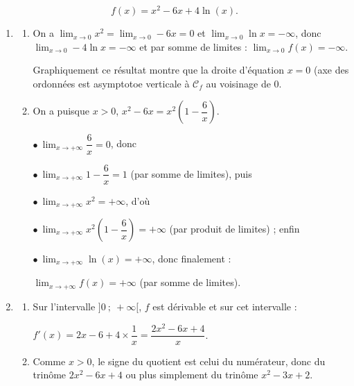 \medskip







\[f(x) = x^2 - 6x + 4\ln (x).\]







\medskip

\begin{enumerate}
\item 
	\begin{enumerate}
		\item 
On a $\displaystyle\lim_{x \to 0} x^2 = \displaystyle\lim_{x \to 0} - 6x = 0$ et $\displaystyle\lim_{x \to 0} \ln x = - \infty$, donc $\displaystyle\lim_{x \to 0} - 4\ln x = - \infty$ et par somme de limites : $\displaystyle\lim_{x \to 0} f(x) = - \infty$.
	

Graphiquement ce résultat montre que la droite d'équation $x = 0$ (axe des ordonnées est asymptotoe verticale à $\mathcal{C}_f$  au voisinage de 0.
		\item 
On a puisque $x > 0$, \: $x^2 - 6x = x^2\left(1 - \dfrac{6}{x}\right)$.

$\bullet~$$\displaystyle\lim_{x \to + \infty} \dfrac{6}{x} = 0$, donc 

$\bullet~$$\displaystyle\lim_{x \to + \infty} 1 - \dfrac{6}{x} = 1$ (par somme de limites), puis

$\bullet~$$\displaystyle\lim_{x \to + \infty} x^2 = + \infty$, d'où

$\bullet~$$\displaystyle\lim_{x \to + \infty}x^2\left(1 - \dfrac{6}{x}\right) = + \infty$ (par produit de limites) ; enfin 

$\bullet~$$\displaystyle\lim_{x \to + \infty}\ln (x) = + \infty$, donc finalement :

$\displaystyle\lim_{x \to + \infty}f(x) = + \infty$ (par somme de limites).
	\end{enumerate}	
\item
	\begin{enumerate}
		\item 
Sur l'intervalle $]0~;~+ \infty[$, \: $f$ est dérivable et sur cet intervalle :

$f'(x) = 2x - 6 + 4 \times \dfrac1x = \dfrac{2x^2 - 6x + 4}{x}$.
		\item 
Comme $x > 0$, le signe du quotient est celui du numérateur, donc du trinôme $2x^2 - 6x + 4$ ou plus simplement du trinôme $x^2 - 3x + 2$.


\end{enumerate}
\end{enumerate}
